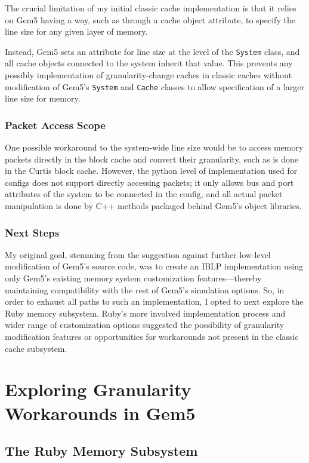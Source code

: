 \documentclass[12pt,twoside]{reedthesis}
\begin{document}
	The crucial limitation of my initial classic cache implementation is that it relies on Gem5 having a way, such as through a cache object attribute, to specify the line size for any given layer of memory.

	Instead, Gem5 sets an attribute for line size at the level of the \verb`System` class, and all cache objects connected to the system inherit that value. This prevents any possibly implementation of granularity-change caches in classic caches without modification of Gem5's \verb`System` and \verb`Cache` classes to allow specification of a larger line size for memory.

	\subsection*{Packet Access Scope}

	One possible workaround to the system-wide line size would be to access memory packets directly in the block cache and convert their granularity, such as is done in the Curtis block cache. However, the python level of implementation used for configs does not support directly accessing packets; it only allows bus and port attributes of the system to be connected in the config, and all actual packet manipulation is done by C++ methods packaged behind Gem5's object libraries.

	\subsection*{Next Steps}

	My original goal, stemming from the suggestion against further low-level modification of Gem5's source code, was to create an IBLP implementation using only Gem5's existing memory system customization features---thereby maintaining compatibility with the rest of Gem5's simulation options. So, in order to exhaust all paths to such an implementation, I opted to next explore the Ruby memory subsystem. Ruby's more involved implementation process and wider range of customization options suggested the possibility of granularity modification features or opportunities for workarounds not present in the classic cache subsystem.


\chapter{Exploring Granularity Workarounds in Gem5}

\section{The Ruby Memory Subsystem}
\end{document}
